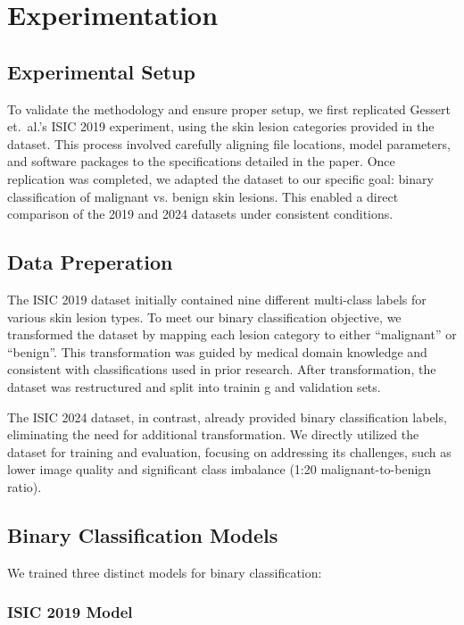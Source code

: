 \documentclass{article}
\begin{document}
\section{Experimentation}

\subsection{Experimental Setup}

To validate the methodology and ensure proper setup, we first replicated Gessert et.\ al.'s ISIC 2019 experiment,
using the skin lesion categories provided in the dataset. This process involved carefully aligning file locations,
model parameters, and software packages to the specifications detailed in the paper. Once replication was
completed, we adapted the dataset to our specific goal: binary classification of malignant vs. benign skin lesions.
This enabled a direct comparison of the 2019 and 2024 datasets under consistent conditions.

\subsection{Data Preperation}

The ISIC 2019 dataset initially contained nine different multi-class labels for various skin lesion types. To meet our binary
classification objective, we transformed the dataset by mapping each lesion category to either ``malignant'' or
``benign''. This transformation was guided by medical domain knowledge and consistent with classifications used
in prior research. After transformation, the dataset was restructured and split into trainin g and validation sets.

The ISIC 2024 dataset, in contrast, already provided binary classification labels, eliminating the need
for additional transformation. We directly utilized the dataset for training and evaluation, focusing on addressing
its challenges, such as lower image quality and significant class imbalance (1:20 malignant-to-benign ratio).

\subsection{Binary Classification Models}

We trained three distinct models for binary classification:

\subsubsection{ISIC 2019 Model}
\end{document}
